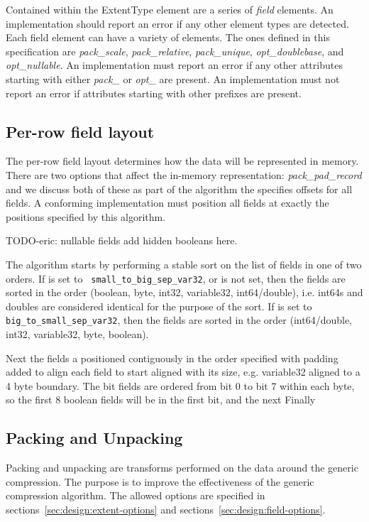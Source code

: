 Contained within the ExtentType element are a series of {\it field} elements.
An implementation should report an error if any other element types are
detected.  Each field element can have a variety of elements.  The ones defined
in this specification are {\it pack\_scale}, {\it pack\_relative}, {\it
  pack\_unique}, {\it opt\_doublebase}, and {\it opt\_nullable}.  An
implementation must report an error if any other attributes starting with
either {\it pack\_} or {\it opt\_} are present.  An implementation must not
report an error if attributes starting with other prefixes are present.

\subsection{Per-row field layout}

The per-row field layout determines how the data will be represented in memory.
There are two options that affect the in-memory representation: {\it
  pack\_pad\_record} and \packFieldOrdering we discuss both of these
as part of the algorithm the specifies offsets for all fields.  A conforming
implementation must position all fields at exactly the positions specified by
this algorithm.

TODO-eric: nullable fields add hidden booleans here.

The algorithm starts by performing a stable sort on the list of fields in one
of two orders.  If \packFieldOrdering is set to {\tt
  small\_to\_big\_sep\_var32}, or is not set, then the fields are sorted in the
order (boolean, byte, int32, variable32, int64/double), i.e. int64s and doubles
are considered identical for the purpose of the sort.  If \packFieldOrdering is
set to {\tt big\_to\_small\_sep\_var32}, then the fields are sorted in the
order (int64/double, int32, variable32, byte, boolean).

Next the fields a positioned contiguously in the order specified with padding
added to align each field to start aligned with its size, e.g. variable32
aligned to a 4 byte boundary.  The bit fields are ordered from bit 0 to bit 7
within each byte, so the first 8 boolean fields will be in the first bit, and the next 
Finally


\subsection{Packing and Unpacking}

Packing and unpacking are transforms performed on the data around the
generic compression.  The purpose is to improve the effectiveness of
the generic compression algorithm.  The allowed options are specified
in sections~\ref{sec:design:extent-options} and
sections~\ref{sec:design:field-options}.

